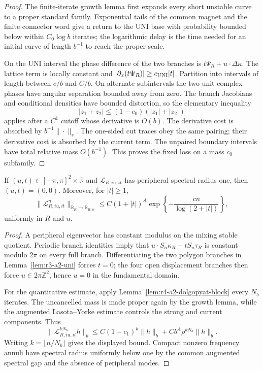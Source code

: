 \begin{proof}
The finite-iterate growth lemma first expands every short unstable curve to a
proper standard family.  Exponential tails of the common magnet and the finite
connector word give a return to the UNI base with probability bounded below
within \(C_0\log b\) iterates; the logarithmic delay is the time needed for an
initial curve of length \(b^{-1}\) to reach the proper scale.

On the UNI interval the phase difference of the two branches is
\(t\Psi_R+u\cdot\Delta\kappa\).  The lattice term is locally constant and
\(|\partial_x(t\Psi_R)|\ge c_{\rm UNI}|t|\).  Partition into intervals of
length between \(c/b\) and \(C/b\).  On alternate subintervals the two unit
complex phases have angular separation bounded away from zero.  The branch
Jacobians and conditional densities have bounded distortion, so the elementary
inequality
\[
 |z_1+z_2|\le(1-c_0)(|z_1|+|z_2|)
\]
applies after a \(C^1\) cutoff whose derivative is \(O(b)\).  The derivative
cost is absorbed by \(b^{-1}\|\cdot\|_s\).  The one-sided cut traces obey the
same pairing; their derivative cost is absorbed by the current term.  The
unpaired boundary intervals have total relative mass \(O(b^{-1})\).  This
proves the fixed loss on a mass \(c_0\) subfamily.
\end{proof}

\begin{theorem}
\label{thm:r3-a2-high}
If \((u,t)\in[-\pi,\pi]^2\times\mathbb R\) and
\(\mathcal L_{R,iu,it}\) has peripheral spectral radius one, then
\((u,t)=(0,0)\).  Moreover, for \(|t|\ge1\),
\[
 \|\mathcal L_{R,iu,it}^n\|_{\mathbb B_R\to\mathbb B_{R,w}}
 \le C(1+|t|)^A
 \exp\left\{-\frac{cn}{\log(2+|t|)}\right\},
\]
uniformly in \(R\) and \(u\).
\end{theorem}

\begin{proof}
A peripheral eigenvector has constant modulus on the mixing stable quotient.
Periodic branch identities imply that
\(u\cdot S_n\kappa_R-tS_n\tau_R\) is constant modulo \(2\pi\) on every full
branch.  Differentiating the two polygon branches in
Lemma~\ref{lem:r3-a2-uni} forces \(t=0\); the four open displacement branches
then force \(u\in2\pi\mathbb Z^2\), hence \(u=0\) in the fundamental domain.

For the quantitative estimate, apply
Lemma~\ref{lem:r4-a2-dolgopyat-block} every \(N_b\) iterates.  The uncancelled
mass is made proper again by the growth lemma, while the augmented
Lasota--Yorke estimate controls the strong and current components.  Thus
\[
 \|\mathcal L_{R,iu,it}^{kN_b}h\|_b
 \le C(1-c_1)^k\|h\|_b+C b^A\rho^{kN_b}\|h\|_b.
\]
Writing \(k=\lfloor n/N_b\rfloor\) gives the displayed bound.  Compact
nonzero frequency annuli have spectral radius uniformly below one by the
common augmented spectral gap and the absence of peripheral modes.
\end{proof}

